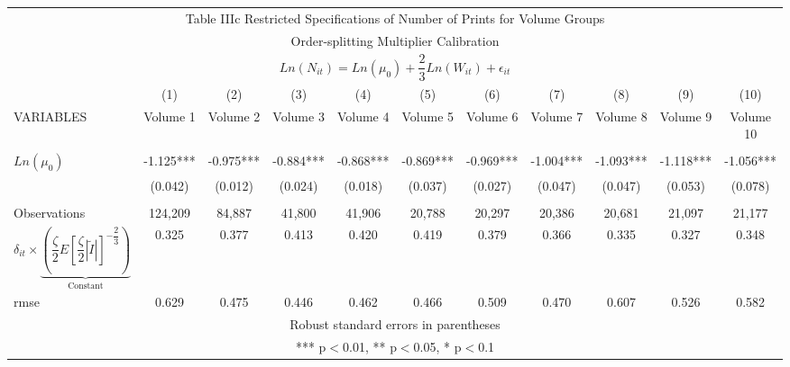 \documentclass[12pt,a4paper]{article}
\begin{document}
\newpage
\begin{landscape}
\begin{table}
\begin{center}
\begin{tabular}{lcccccccccc}
\multicolumn{11}{c}{Table IIIc Restricted Specifications of Number of Prints for Volume Groups} \\ 
\multicolumn{11}{c}{Order-splitting Multiplier Calibration} \\
\multicolumn{11}{c}{$Ln(N_{it}) = Ln(\mu_{0}) + \dfrac{2}{3} Ln(W_{it}) + \epsilon_{it}$} \\\hline
 & (1) & (2) & (3) & (4) & (5) & (6) & (7) & (8) & (9) & (10) \\
VARIABLES & Volume 1 & Volume 2 & Volume 3 & Volume 4 & Volume 5 & Volume 6 & Volume 7 & Volume 8 & Volume 9 & Volume 10 \\ \hline
 &  &  &  &  &  &  &  &  &  &  \\
$Ln(\mu_{0})$ & -1.125*** & -0.975*** & -0.884*** & -0.868*** & -0.869*** & -0.969*** & -1.004*** & -1.093*** & -1.118*** & -1.056*** \\
 & (0.042) & (0.012) & (0.024) & (0.018) & (0.037) & (0.027) & (0.047) & (0.047) & (0.053) & (0.078) \\
 &  &  &  &  &  &  &  &  &  &  \\
Observations & 124,209 & 84,887 & 41,800 & 41,906 & 20,788 & 20,297 & 20,386 & 20,681 & 21,097 & 21,177 \\
$\delta_{it}\times \underbrace{(\dfrac{\zeta}{2}E[\dfrac{\zeta}{2}|\tilde{I}|]^{-\dfrac{2}{3}})}_{\text{Constant}}$ & 0.325 & 0.377 & 0.413 & 0.420 & 0.419 & 0.379 & 0.366 & 0.335 & 0.327 & 0.348 \\
 rmse & 0.629 & 0.475 & 0.446 & 0.462 & 0.466 & 0.509 & 0.470 & 0.607 & 0.526 & 0.582 \\ \hline
\multicolumn{11}{c}{ Robust standard errors in parentheses} \\
\multicolumn{11}{c}{ *** p$<$0.01, ** p$<$0.05, * p$<$0.1} \\
\end{tabular}
\end{center}
\end{table}
\end{landscape}
\end{document}
